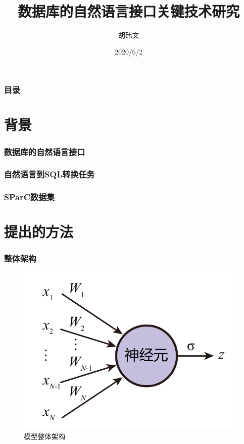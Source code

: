 \documentclass{ctexbeamer}
\title[数据库的自然语言接口]{数据库的自然语言接口关键技术研究}
\author{胡玮文}
\institute[SCUT]{华南理工大学}
\date{2020/6/2}
\begin{document}
\frame{\titlepage}
\logo{}



\begin{frame}
  \frametitle{目录}
  \tableofcontents
\end{frame}

\section{背景}
\begin{frame}
  \frametitle{数据库的自然语言接口}
\end{frame}
\begin{frame}
  \frametitle{自然语言到SQL转换任务}
\end{frame}
\begin{frame}
  \frametitle{SParC数据集}
\end{frame}

\section{提出的方法}
\begin{frame}
  \frametitle{整体架构}
  \begin{figure}
    \includegraphics[page=6,width=\linewidth]{figure/figures.pdf}
    \caption{模型整体架构}
  \end{figure}
\end{frame}
\end{document}

